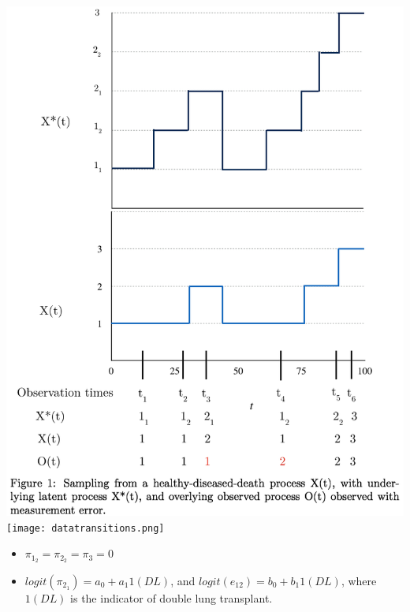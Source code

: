 \documentclass{beamer}
\begin{document}
\begin{frame}
\includegraphics[scale=0.4]{figprocessAndsampling5.png}
\hspace{3mm}
\texttt{[image: datatransitions.png]}
\end{frame}

\begin{frame}
\begin{itemize}
\item $\pi_{1_2}=\pi_{2_2}=\pi_3=0$
\vspace{5mm}
\item $logit(\pi_{2_1}) = a_0 + a_1 1(DL)$, and $logit(e_{12})=b_0 + b_1 1(DL)$, where $1(DL)$ is the indicator of double lung transplant.
\end{itemize}
\end{frame}
\end{document}
